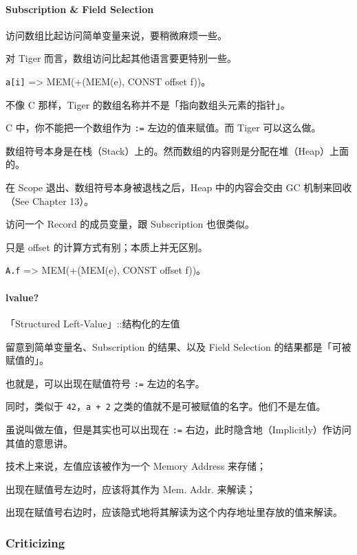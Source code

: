 \documentclass[
]{article}
\begin{document}
\hypertarget{header-n122}{%
\paragraph{Subscription \& Field Selection}\label{header-n122}}

访问数组比起访问简单变量来说，要稍微麻烦一些。

对 Tiger 而言，数组访问比起其他语言要更特别一些。

\texttt{a{[}i{]}} =\textgreater{} MEM(+(MEM(e), CONST offset f))。

不像 C 那样，Tiger 的数组名称并不是「指向数组头元素的指针」。

C 中，你不能把一个数组作为 \texttt{:=} 左边的值来赋值。而 Tiger
可以这么做。

数组符号本身是在栈（Stack）上的。然而数组的内容则是分配在堆（Heap）上面的。

在 Scope 退出、数组符号本身被退栈之后，Heap 中的内容会交由 GC
机制来回收（See Chapter 13）。

访问一个 Record 的成员变量，跟 Subscription 也很类似。

只是 offset 的计算方式有别；本质上并无区别。

\texttt{A.f} =\textgreater{} MEM(+(MEM(e), CONST offset f))。

\hypertarget{header-n133}{%
\paragraph{lvalue?}\label{header-n133}}

「Structured Left-Value」::结构化的左值

留意到简单变量名、Subscription 的结果、以及 Field Selection
的结果都是「可被赋值的」。

也就是，可以出现在赋值符号 \texttt{:=} 左边的名字。

同时，类似于 \texttt{42}，\texttt{a\ +\ 2}
之类的值就不是可被赋值的名字。他们不是左值。

虽说叫做左值，但是其实也可以出现在 \texttt{:=}
右边，此时隐含地（Implicitly）作访问其值的意思讲。

技术上来说，左值应该被作为一个 Memory Address 来存储；

出现在赋值号左边时，应该将其作为 Mem. Addr. 来解读；

出现在赋值号右边时，应该隐式地将其解读为这个内存地址里存放的值来解读。

\hypertarget{header-n142}{%
\subsubsection{Criticizing}\label{header-n142}}
\end{document}
